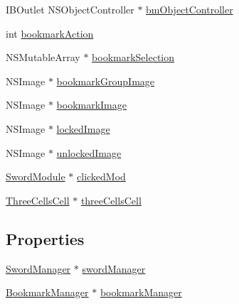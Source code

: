 \begin{DoxyCompactItemize}
I\-B\-Outlet N\-S\-Object\-Controller $\ast$ \hyperlink{interface_left_side_bar_view_controller_a50b95db83f3ecb6b19c92fc0d94af603}{bm\-Object\-Controller}
\item 
int \hyperlink{interface_left_side_bar_view_controller_a00b1acbd6f8cdc01fdbc3809ccd358fb}{bookmark\-Action}
\item 
N\-S\-Mutable\-Array $\ast$ \hyperlink{interface_left_side_bar_view_controller_a174278313f9d274b3f2a63a26fbf5229}{bookmark\-Selection}
\item 
N\-S\-Image $\ast$ \hyperlink{interface_left_side_bar_view_controller_a2e6bc5349e12f2159686ae9fbc8fefd1}{bookmark\-Group\-Image}
\item 
N\-S\-Image $\ast$ \hyperlink{interface_left_side_bar_view_controller_a5ba2bd5ece124f544078b970ae659306}{bookmark\-Image}
\item 
N\-S\-Image $\ast$ \hyperlink{interface_left_side_bar_view_controller_a4c2ced80a355c699b9507e796eab7dd0}{locked\-Image}
\item 
N\-S\-Image $\ast$ \hyperlink{interface_left_side_bar_view_controller_a358d77317f8bf0ccba15c05291f2d9bb}{unlocked\-Image}
\item 
\hyperlink{interface_sword_module}{Sword\-Module} $\ast$ \hyperlink{interface_left_side_bar_view_controller_acde7208b66a08cbd74063056c7f143b1}{clicked\-Mod}
\item 
\hyperlink{interface_three_cells_cell}{Three\-Cells\-Cell} $\ast$ \hyperlink{interface_left_side_bar_view_controller_a44d3caed8923ca666be93eebfca322b4}{three\-Cells\-Cell}
\end{DoxyCompactItemize}
\subsection*{Properties}
\begin{DoxyCompactItemize}
\item 
\hyperlink{interface_sword_manager}{Sword\-Manager} $\ast$ \hyperlink{interface_left_side_bar_view_controller_a5c5d0eea93f588d2bcc46da1b6db122e}{sword\-Manager}
\item 
\hyperlink{interface_bookmark_manager}{Bookmark\-Manager} $\ast$ \hyperlink{interface_left_side_bar_view_controller_aa5e67105514f413e2d129fdc60be4c6c}{bookmark\-Manager}
\end{DoxyCompactItemize}


